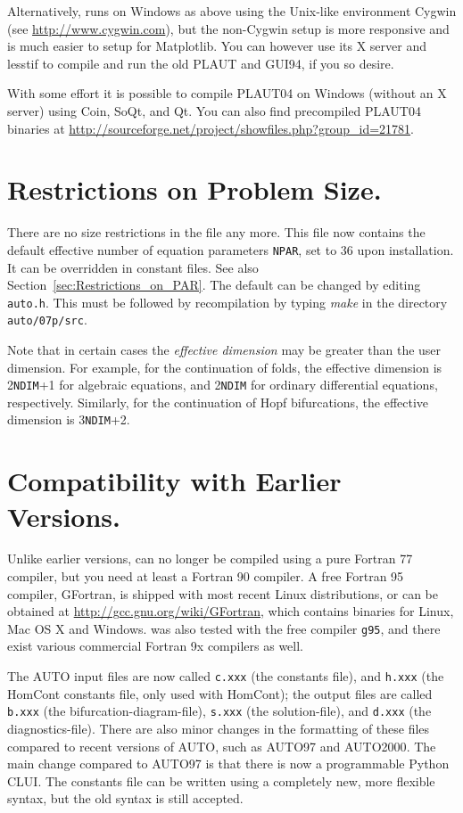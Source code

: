 \documentclass[12pt]{report}
\begin{document}
Alternatively, \AUTO runs on Windows as above using the Unix-like
environment Cygwin (see \url{http://www.cygwin.com}), but the
non-Cygwin setup is more responsive and is much easier to setup for
Matplotlib. You can however use its X server and lesstif to compile
and run the old {\cal PLAUT} and GUI94, if you so desire.

With some effort it is possible to compile {\cal PLAUT04}
on Windows (without an X server) using Coin, SoQt, and Qt. You can
also find precompiled {\cal PLAUT04} binaries at
\url{http://sourceforge.net/project/showfiles.php?group_id=21781}.

\section{ Restrictions on Problem Size.} \label{sec:Restrictions}
There are no size restrictions in the file  any more. This file now contains the
default effective number of equation parameters {\tt NPAR}, set to 36
upon installation. It can be overridden in constant files.
See also Section~\ref{sec:Restrictions_on_PAR}.
The default can be changed by editing {\tt auto.h}.
This must be followed by recompilation by typing {\it make} 
in the directory {\tt auto/07p/src}.

Note that in certain cases the {\it effective dimension} may be greater
than the user dimension.
For example, for the continuation of folds,
the effective dimension is 2{\tt NDIM}+1 for algebraic equations,
and 2{\tt NDIM} for ordinary differential equations, respectively.
Similarly, for the continuation of Hopf bifurcations,
the effective dimension is 3{\tt NDIM}+2.
 
 
\section{ Compatibility with Earlier Versions.} \label{sec:Compatibility}
Unlike earlier versions, \AUTO can no longer be compiled using a pure
Fortran 77 compiler, but you need at least a Fortran 90 compiler.
A free Fortran 95 compiler, GFortran, is shipped with most recent
Linux distributions, or can be obtained at
\url{http://gcc.gnu.org/wiki/GFortran}, which contains binaries for
Linux, Mac OS X and Windows. \AUTO was also tested with the free
compiler {\tt g95}, and there exist various commercial Fortran
9x compilers as well.

The {\cal AUTO} input files are now called 
{\tt c.xxx} (the constants file),
and
{\tt h.xxx} (the {\cal HomCont} constants file, only used with {\cal HomCont});
the output files are called
{\tt b.xxx} (the bifurcation-diagram-file),
{\tt s.xxx} (the solution-file),
and
{\tt d.xxx} (the diagnostics-file).
There are also minor changes in the formatting of these files 
compared to recent versions of {\cal AUTO}, such as {\cal AUTO97} 
and {\cal AUTO2000}.
The main change compared to {\cal AUTO97} is that there is now a
programmable Python CLUI. The constants file can be written using
a completely new, more flexible syntax, but the old syntax is
still accepted.
\end{document}
